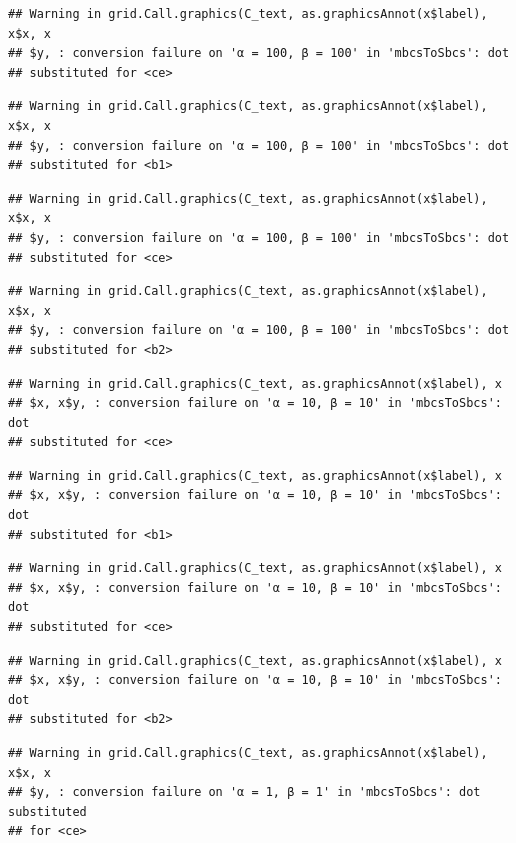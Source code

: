 \documentclass[]{book}
\theoremstyle{definition}
\theoremstyle{definition}
\theoremstyle{definition}
\theoremstyle{remark}
\begin{document}
\begin{verbatim}
## Warning in grid.Call.graphics(C_text, as.graphicsAnnot(x$label), x$x, x
## $y, : conversion failure on 'α = 100, β = 100' in 'mbcsToSbcs': dot
## substituted for <ce>
\end{verbatim}

\begin{verbatim}
## Warning in grid.Call.graphics(C_text, as.graphicsAnnot(x$label), x$x, x
## $y, : conversion failure on 'α = 100, β = 100' in 'mbcsToSbcs': dot
## substituted for <b1>
\end{verbatim}

\begin{verbatim}
## Warning in grid.Call.graphics(C_text, as.graphicsAnnot(x$label), x$x, x
## $y, : conversion failure on 'α = 100, β = 100' in 'mbcsToSbcs': dot
## substituted for <ce>
\end{verbatim}

\begin{verbatim}
## Warning in grid.Call.graphics(C_text, as.graphicsAnnot(x$label), x$x, x
## $y, : conversion failure on 'α = 100, β = 100' in 'mbcsToSbcs': dot
## substituted for <b2>
\end{verbatim}

\begin{verbatim}
## Warning in grid.Call.graphics(C_text, as.graphicsAnnot(x$label), x
## $x, x$y, : conversion failure on 'α = 10, β = 10' in 'mbcsToSbcs': dot
## substituted for <ce>
\end{verbatim}

\begin{verbatim}
## Warning in grid.Call.graphics(C_text, as.graphicsAnnot(x$label), x
## $x, x$y, : conversion failure on 'α = 10, β = 10' in 'mbcsToSbcs': dot
## substituted for <b1>
\end{verbatim}

\begin{verbatim}
## Warning in grid.Call.graphics(C_text, as.graphicsAnnot(x$label), x
## $x, x$y, : conversion failure on 'α = 10, β = 10' in 'mbcsToSbcs': dot
## substituted for <ce>
\end{verbatim}

\begin{verbatim}
## Warning in grid.Call.graphics(C_text, as.graphicsAnnot(x$label), x
## $x, x$y, : conversion failure on 'α = 10, β = 10' in 'mbcsToSbcs': dot
## substituted for <b2>
\end{verbatim}

\begin{verbatim}
## Warning in grid.Call.graphics(C_text, as.graphicsAnnot(x$label), x$x, x
## $y, : conversion failure on 'α = 1, β = 1' in 'mbcsToSbcs': dot substituted
## for <ce>
\end{verbatim}
\end{document}
